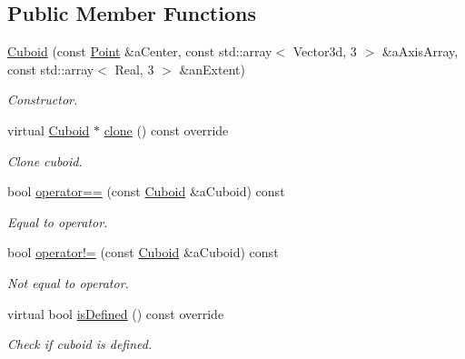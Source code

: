 \subsection*{Public Member Functions}
\begin{DoxyCompactItemize}
\item 
\hyperlink{classlibrary_1_1math_1_1geom_1_1d3_1_1objects_1_1_cuboid_ac42299f962fab284a76a46d4ea4e6fa2}{Cuboid} (const \hyperlink{classlibrary_1_1math_1_1geom_1_1d3_1_1objects_1_1_point}{Point} \&a\+Center, const std\+::array$<$ Vector3d, 3 $>$ \&a\+Axis\+Array, const std\+::array$<$ Real, 3 $>$ \&an\+Extent)
\begin{DoxyCompactList}\small\item\em Constructor. \end{DoxyCompactList}\item 
virtual \hyperlink{classlibrary_1_1math_1_1geom_1_1d3_1_1objects_1_1_cuboid}{Cuboid} $\ast$ \hyperlink{classlibrary_1_1math_1_1geom_1_1d3_1_1objects_1_1_cuboid_ae60199a546a4d4de479f891c3b1db05a}{clone} () const override
\begin{DoxyCompactList}\small\item\em Clone cuboid. \end{DoxyCompactList}\item 
bool \hyperlink{classlibrary_1_1math_1_1geom_1_1d3_1_1objects_1_1_cuboid_ae458fddf898e938729f41d645f64cd34}{operator==} (const \hyperlink{classlibrary_1_1math_1_1geom_1_1d3_1_1objects_1_1_cuboid}{Cuboid} \&a\+Cuboid) const
\begin{DoxyCompactList}\small\item\em Equal to operator. \end{DoxyCompactList}\item 
bool \hyperlink{classlibrary_1_1math_1_1geom_1_1d3_1_1objects_1_1_cuboid_a70172b03f3dc65fc6526116b04b5af73}{operator!=} (const \hyperlink{classlibrary_1_1math_1_1geom_1_1d3_1_1objects_1_1_cuboid}{Cuboid} \&a\+Cuboid) const
\begin{DoxyCompactList}\small\item\em Not equal to operator. \end{DoxyCompactList}\item 
virtual bool \hyperlink{classlibrary_1_1math_1_1geom_1_1d3_1_1objects_1_1_cuboid_ac64560345dc021b569eed66004af96ee}{is\+Defined} () const override
\begin{DoxyCompactList}\small\item\em Check if cuboid is defined. \end{DoxyCompactList}\item 

\end{DoxyCompactItemize}
